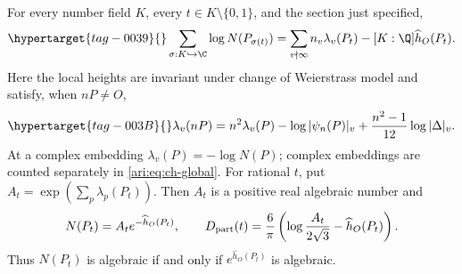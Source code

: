 \begin{proposition}\hypertarget{tag-000V}{}\label{ari:C.6.1}

For every number field $K$, every $t\in K\setminus\{0,1\}$,
and the section just specified,
\begin{equation}\hypertarget{tag-0039}{}\label{ari:eq:ch-global}
 \sum_{\sigma:K\hookrightarrow\C}\log N(P_{\sigma(t)})
 =\sum_{v\nmid\infty}n_v\lambda_v(P_t)
          -[K:\Q]\widehat h_O(P_t).
\end{equation}
Here the local heights are invariant under change of Weierstrass
model and satisfy, when $nP\ne O$,
\begin{equation}\hypertarget{tag-003B}{}\label{ari:eq:ch-local-mult}
 \lambda_v(nP)=n^2\lambda_v(P)-\log|\psi_n(P)|_v
                   +\frac{n^2-1}{12}\log|\Delta|_v.
\end{equation}
At a complex embedding $\lambda_v(P)=-\log N(P)$; complex
embeddings are counted separately in \eqref{ari:eq:ch-global}.
For rational $t$, put $A_t=\exp(\sum_p\lambda_p(P_t))$.
Then $A_t$ is a positive real algebraic number and
\[
 N(P_t)=A_t e^{-\widehat h_O(P_t)},\qquad
 D_{\rm part}(t)=\frac6\pi
       \left(\log\frac{A_t}{2\sqrt3}-\widehat h_O(P_t)\right).
\]
Thus $N(P_t)$ is algebraic if and only if
$e^{\widehat h_O(P_t)}$ is algebraic.
\end{proposition}


